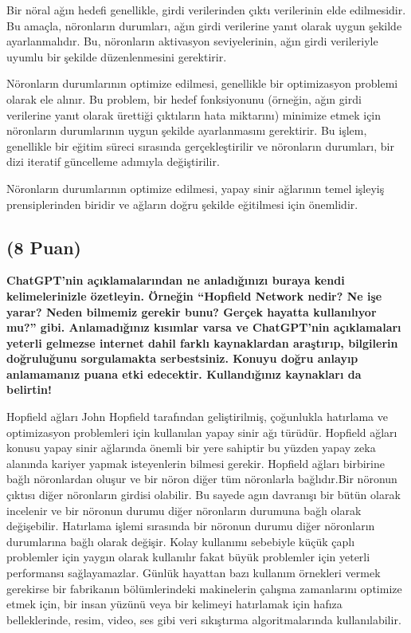\documentclass[11pt]{article}
\begin{document}
Bir nöral ağın hedefi genellikle, girdi verilerinden çıktı verilerinin elde edilmesidir. Bu amaçla, nöronların durumları, ağın girdi verilerine yanıt olarak uygun şekilde ayarlanmalıdır. Bu, nöronların aktivasyon seviyelerinin, ağın girdi verileriyle uyumlu bir şekilde düzenlenmesini gerektirir.

Nöronların durumlarının optimize edilmesi, genellikle bir optimizasyon problemi olarak ele alınır. Bu problem, bir hedef fonksiyonunu (örneğin, ağın girdi verilerine yanıt olarak ürettiği çıktıların hata miktarını) minimize etmek için nöronların durumlarının uygun şekilde ayarlanmasını gerektirir. Bu işlem, genellikle bir eğitim süreci sırasında gerçekleştirilir ve nöronların durumları, bir dizi iteratif güncelleme adımıyla değiştirilir.

Nöronların durumlarının optimize edilmesi, yapay sinir ağlarının temel işleyiş prensiplerinden biridir ve ağların doğru şekilde eğitilmesi için önemlidir.



\subsection{(8 Puan)} \textbf{ChatGPT’nin açıklamalarından ne anladığınızı buraya kendi kelimelerinizle özetleyin. Örneğin ``Hopfield Network nedir? Ne işe yarar? Neden bilmemiz gerekir bunu? Gerçek hayatta kullanılıyor mu?'' gibi. Anlamadığınız kısımlar varsa ve ChatGPT’nin açıklamaları yeterli gelmezse internet dahil farklı kaynaklardan araştırıp, bilgilerin doğruluğunu sorgulamakta serbestsiniz. Konuyu doğru anlayıp anlamamanız puana etki edecektir. Kullandığınız kaynakları da belirtin!}


Hopfield ağları John Hopfield tarafından geliştirilmiş, çoğunlukla hatırlama ve optimizasyon problemleri için kullanılan yapay sinir ağı türüdür. Hopfield ağları konusu yapay sinir ağlarında önemli bir yere sahiptir bu yüzden yapay zeka alanında kariyer yapmak isteyenlerin bilmesi gerekir.
Hopfield ağları birbirine bağlı nöronlardan oluşur ve bir nöron diğer tüm nöronlarla bağlıdır.Bir nöronun çıktısı diğer nöronların girdisi olabilir. Bu sayede agın davranışı bir bütün olarak incelenir ve bir nöronun durumu diğer nöronların durumuna bağlı olarak değişebilir. Hatırlama işlemi sırasında bir nöronun durumu diğer nöronların durumlarına bağlı olarak değişir.
Kolay kullanımı sebebiyle küçük çaplı problemler için yaygın olarak kullanılır fakat büyük problemler için yeterli performansı sağlayamazlar. Günlük hayattan bazı kullanım örnekleri vermek gerekirse bir fabrikanın bölümlerindeki makinelerin çalışma zamanlarını optimize etmek için, bir insan yüzünü veya bir kelimeyi hatırlamak için hafıza belleklerinde, resim, video, ses gibi veri sıkıştırma algoritmalarında kullanılabilir.
\end{document}
